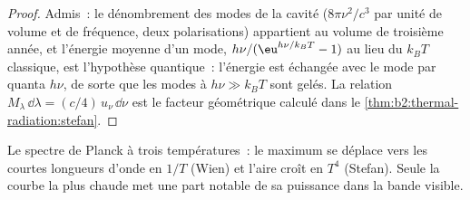 \begin{proof}
Admis~: le dénombrement des modes de la cavité ($8\pi\nu^2/c^3$ par unité
de volume et de fréquence, deux polarisations) appartient au volume de troisième année,
et l'énergie moyenne d'un mode, $h\nu/(\eu^{h\nu/k_BT} - 1)$ au lieu du
$k_BT$ classique, est l'hypothèse quantique~: l'énergie est échangée avec
le mode par quanta $h\nu$, de sorte que les modes à $h\nu \gg k_BT$ sont
gelés. La relation $M_\lambda\,\dd\lambda = (c/4)\,u_\nu\,\dd\nu$ est le
facteur géométrique calculé dans le \cref{thm:b2:thermal-radiation:stefan}.
\end{proof}

\begin{omfigure}

{\small Le spectre de Planck à trois températures~: le maximum se déplace vers les
courtes longueurs d'onde en $1/T$ (Wien) et l'aire croît en $T^4$
(Stefan). Seule la courbe la plus chaude met une part notable de sa puissance dans la bande
visible.}
\end{omfigure}


